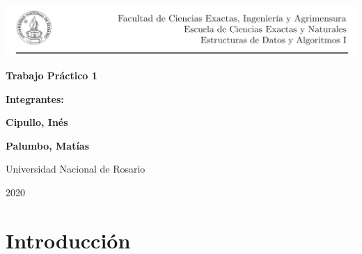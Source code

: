\documentclass{article}
\begin{document}
\begin{titlepage}
    \hspace{-1.2cm}\includegraphics[scale= 0.8]{header2}
    \begin{center}
        \vfill
        \vfill
            \vspace{0.7cm}
            \noindent\textbf{\Huge Trabajo Práctico 1}\par
            \vspace{.5cm}
        \vfill
        \noindent \textbf{\huge Integrantes:}\par
        \vspace{.5cm}
        \noindent \textbf{\Large Cipullo, Inés}\par
        \noindent \textbf{\Large Palumbo, Matías}\par
        
 
        \vfill
        \large Universidad Nacional de Rosario \par
        \noindent\large 2020
             
    \end{center}
 \end{titlepage}
 

\section{Introducción}
\end{document}
